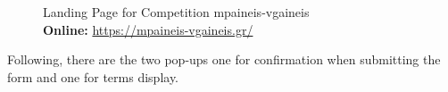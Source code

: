 \begin{figure}[H]
	\centering
	\qquad
	\caption{
		Landing Page for Competition mpaineis-vgaineis
		\\
		\textbf{Online: } \url{https://mpaineis-vgaineis.gr/}
	}
	\label{fig:example}
\end{figure}

Following, there are the two pop-ups one for confirmation when submitting the form and one for terms display.

